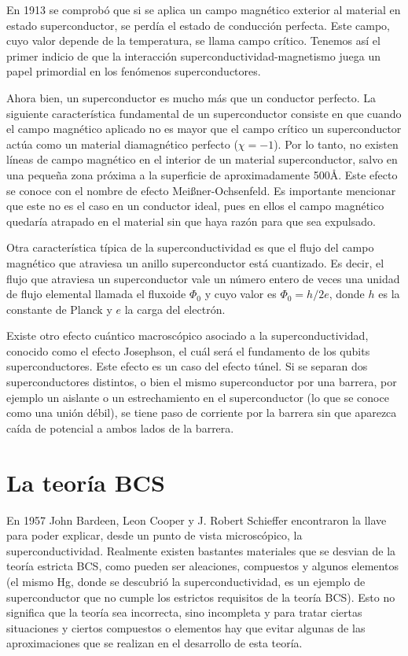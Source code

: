 En 1913 \cite{Tinkham_1996} se comprobó que si se aplica un campo magnético exterior al material en estado superconductor, se perdía el estado de conducción perfecta. Este campo, cuyo valor depende de la temperatura, se llama campo crítico. Tenemos así el primer indicio de que la interacción superconductividad-magnetismo juega un papel primordial en los fenómenos superconductores.

Ahora bien, un superconductor es mucho más que un conductor perfecto. La siguiente característica fundamental de un superconductor consiste en que cuando el campo magnético aplicado no es mayor que el campo  crítico un superconductor actúa como un material diamagnético perfecto ($\chi = -1$). Por lo tanto, no existen líneas de campo magnético en el interior de un material superconductor, salvo en una pequeña zona próxima a la superficie de aproximadamente 500Å. Este efecto se conoce con el nombre de efecto Mei{\ss}ner-Ochsenfeld. Es importante mencionar que este no es el caso en un conductor ideal, pues en ellos el campo magnético quedaría atrapado en el material sin que haya razón para que sea expulsado.

Otra característica típica de la superconductividad es que el flujo del campo magnético que atraviesa un anillo superconductor está cuantizado. Es decir, el flujo que atraviesa un superconductor vale un número entero de veces una unidad de flujo elemental llamada el fluxoide $\Phi_0$ y cuyo valor es $\Phi_0 = h /2 e$, donde $h$ es la constante de Planck y $e$ la carga del electrón.

Existe otro efecto cuántico macroscópico asociado a la superconductividad, conocido como el efecto Josephson, el cuál será el fundamento de los qubits superconductores. Este efecto es un caso del efecto túnel. Si se separan dos superconductores distintos, o bien el mismo superconductor por una barrera, por ejemplo un aislante o un estrechamiento en el superconductor (lo que se conoce como una unión débil), se tiene paso de corriente por la barrera sin que aparezca caída de potencial a ambos lados de la barrera.


\section{La teoría BCS}

En 1957 John Bardeen, Leon Cooper y J. Robert Schieffer \cite{bcs} encontraron la llave para poder explicar, desde un punto de vista microscópico, la superconductividad. Realmente existen bastantes materiales que se desvian de la teoría estricta BCS, como pueden ser aleaciones, compuestos y algunos elementos (el mismo Hg, donde se descubrió la superconductividad, es un ejemplo de superconductor que no cumple los estrictos requisitos de la teoría BCS). Esto no significa que la teoría sea incorrecta, sino incompleta y para tratar ciertas situaciones y ciertos compuestos o elementos hay que evitar algunas de las aproximaciones que se realizan en el desarrollo de esta teoría.

